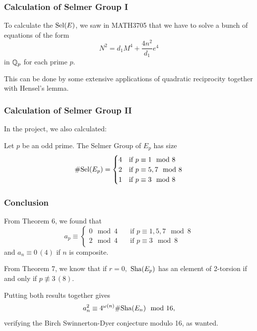 \documentclass{beamer}
\begin{document}
\begin{frame}
  \frametitle{Calculation of Selmer Group I}
  To calculate the $\text{\normalfont Sel}(E)$, we saw in MATH3705 that we have to solve a
  bunch of equations of the form
  \[N^2 = d_1M^4 + \frac{4n^2}{d_1} e^4\]
  in ${\mathbb Q}_p$ for each prime $p.$ \pause
  \bigskip

  This can be done by some extensive applications
  of quadratic reciprocity together
  with Hensel's lemma.
\end{frame}

\begin{frame}
  \frametitle{Calculation of Selmer Group II}
  In the project, we also calculated:
  \begin{theorem}
    Let $p$ be an odd prime. The Selmer Group of $E_p$ has size
    \[\# \text{\normalfont Sel}(E_p) =
      \begin{cases}
        4 &\text{if } p \equiv 1 \mod{8} \\
        2 &\text{if } p \equiv 5,7 \mod{8} \\
        1 &\text{if } p \equiv 3 \mod{8}
      \end{cases}
    \]
  \end{theorem}
\end{frame}

\begin{frame}
  \frametitle{Conclusion}
  From Theorem 6, we found that 
  \[a_p \equiv
    \begin{cases}
      0 \mod{4} \quad &\text{if } p \equiv 1,5,7 \mod{8} \\
      2 \mod{4} \quad &\text{if } p \equiv 3 \mod{8}
    \end{cases}
  \]
  and $a_n \equiv 0 \, (4)$ if $n$ is composite. \pause
  \bigskip

  From Theorem 7, we know that if $r = 0,$
  $\text{\normalfont Sha}(E_p)$ has an element of 2-torsion if and only if $p
  \not\equiv 3 \, (8).$ \pause
  \bigskip

  Putting both results together gives
  \[a_n^2 \equiv 4^{\omega(n)} \# \text{\normalfont Sha}(E_n) \mod{16},\]
  verifying the Birch Swinnerton-Dyer conjecture modulo 16, as wanted.
\end{frame}
\end{document}
